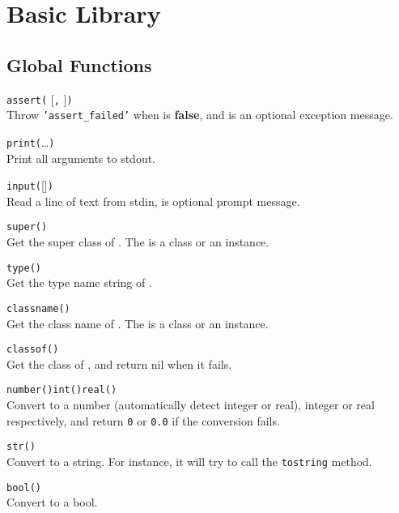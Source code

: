 \section*{Basic Library}

\subsection*{Global Functions}

\hangpar \texttt{assert(} [\texttt{,} ]\texttt{)}\\
Throw \texttt{'assert\_failed'} when  is \textbf{false}, and  is an optional exception message.

\hangpar \texttt{print(}\dots\texttt{)}\\
Print all arguments to stdout.

\hangpar \texttt{input(}[]\texttt{)}\\
Read a line of text from stdin,  is optional prompt message.

\hangpar \texttt{super(}\texttt{)}\\
Get the super class of . The  is a class or an instance.

\hangpar \texttt{type(}\texttt{)}\\
Get the type name string of .

\hangpar \texttt{classname(}\texttt{)}\\
Get the class name of . The  is a class or an instance.

\hangpar \texttt{classof(}\texttt{)}\\
Get the class of , and return nil when it fails.

\hangpar \texttt{number(}\texttt{)}\quad \hangpar \texttt{int(}\texttt{)}\quad \hangpar \texttt{real(}\texttt{)}\\
Convert  to a number (automatically detect integer or real), integer or real respectively, and return \texttt{0} or \texttt{0.0} if the conversion fails.

\hangpar \texttt{str(}\texttt{)}\\
Convert  to a string. For instance, it will try to call the \texttt{tostring} method.

\hangpar \texttt{bool(}\texttt{)}\\
Convert  to a bool.

